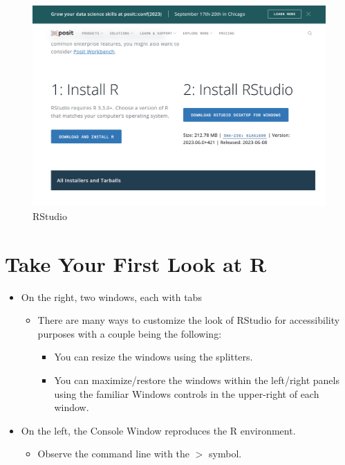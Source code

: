 \documentclass[
  letterpaper,
  DIV=11,
  numbers=noendperiod]{scrreprt}
\providecommand{\tightlist}{%
  \setlength{\itemsep}{0pt}\setlength{\parskip}{0pt}}\usepackage{longtable,booktabs,array}
\begin{document}
\begin{figure}[H]

{\centering \includegraphics{Pictures/Ch0/RStudio.png}

}

\caption{RStudio}

\end{figure}%


\chapter{Take Your First Look at R}\label{take-your-first-look-at-r}

\begin{itemize}
\tightlist
\item
  On the right, two windows, each with tabs

  \begin{itemize}
  \tightlist
  \item
    There are many ways to customize the look of RStudio for
    accessibility purposes with a couple being the following:

    \begin{itemize}
    \tightlist
    \item
      You can resize the windows using the splitters.
    \item
      You can maximize/restore the windows within the left/right panels
      using the familiar Windows controls in the upper-right of each
      window.
    \end{itemize}
  \end{itemize}
\item
  On the left, the Console Window reproduces the R environment.

  \begin{itemize}
  \tightlist
  \item
    Observe the command line with the \(>\) symbol.
  \end{itemize}
\end{itemize}
\end{document}

